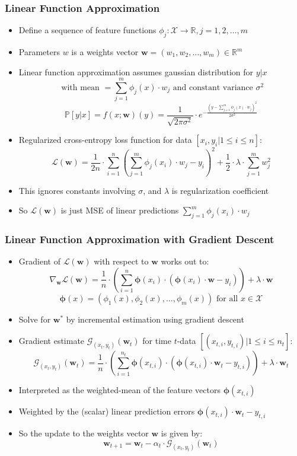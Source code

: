 \documentclass[handout]{beamer}
\begin{document}
\begin{frame}
\frametitle{Linear Function Approximation}
\pause
\begin{itemize}[<+->]
\item Define a sequence of feature functions $\phi_j: \mathcal{X} \rightarrow \mathbb{R}, j = 1, 2, \ldots, m$
\item Parameters $w$ is a weights vector $\bm{w} = (w_1, w_2, \ldots, w_m) \in \mathbb{R}^m$
\item Linear function approximation assumes gaussian distribution for $y|x$
$$\text{ with mean } = \sum_{j=1}^m \phi_j(x) \cdot w_j \text{ and constant variance } \sigma^2$$
$$\mathbb{P}[y|x] = f(x;\bm{w})(y) = \frac {1} {\sqrt{2\pi \sigma^2}} \cdot e^{-\frac {(y - \sum_{j=1}^m \phi_j(x) \cdot w_j)^2} {2\sigma^2}}$$
\item Regularized cross-entropy loss function for data $[x_i, y_i|1 \leq i \leq n]$:
$$\mathcal{L}(\bm{w}) = \frac 1 {2n} \cdot \sum_{i=1}^n (\sum_{j=1}^m \phi_j(x_i) \cdot w_j - y_i)^2 + \frac 1 2 \cdot\lambda \cdot \sum_{j=1}^m w_j^2$$
\item This ignores constants involving $\sigma$, and $\lambda$ is regularization coefficient
\item So $\mathcal{L}(\bm{w})$ is just MSE of linear predictions $\sum_{j=1}^m \phi_j(x_i) \cdot w_j$
\end{itemize}
\end{frame}

\begin{frame}
\frametitle{Linear Function Approximation with Gradient Descent}
\pause
\begin{itemize}[<+->]
\item Gradient of $\mathcal{L}(\bm{w})$ with respect to $\bm{w}$ works out to:
$$\nabla_{\bm{w}} \mathcal{L}(\bm{w}) = \frac 1 n \cdot (\sum_{i=1}^n \bm{\phi}(x_i) \cdot (\bm{\phi}(x_i) \cdot \bm{w} - y_i)) + \lambda \cdot \bm{w}$$
$$\bm{\phi}(x) = (\phi_1(x), \phi_2(x), \ldots, \phi_m(x)) \text{ for all } x \in \mathcal{X}$$
\item Solve for $\bm{w^*}$ by incremental estimation using gradient descent
\item Gradient estimate $\mathcal{G}_{(x_t,y_t)}(\bm{w}_t)$ for time $t$-data $[(x_{t,i}, y_{t,i})|1 \leq i \leq n_t]$:
$$\mathcal{G}_{(x_t, y_t)}(\bm{w}_t) = \frac 1 n \cdot (\sum_{i=1}^{n_t} \bm{\phi}(x_{t,i}) \cdot (\bm{\phi}(x_{t,i}) \cdot \bm{w}_t - y_{t,i})) + \lambda \cdot \bm{w}_t$$
\item Interpreted as the weighted-mean of the feature vectors $\bm{\phi}(x_{t,i})$
\item Weighted by the (scalar) linear prediction errors $\bm{\phi}(x_{t,i}) \cdot \bm{w}_t - y_{t,i}$
\item So the update to the weights vector $\bm{w}$ is given by:
$$\bm{w}_{t+1} = \bm{w}_t - \alpha_t \cdot \mathcal{G}_{(x_t, y_t)}(\bm{w}_t)$$
\end{itemize}
\end{frame}
\end{document}
